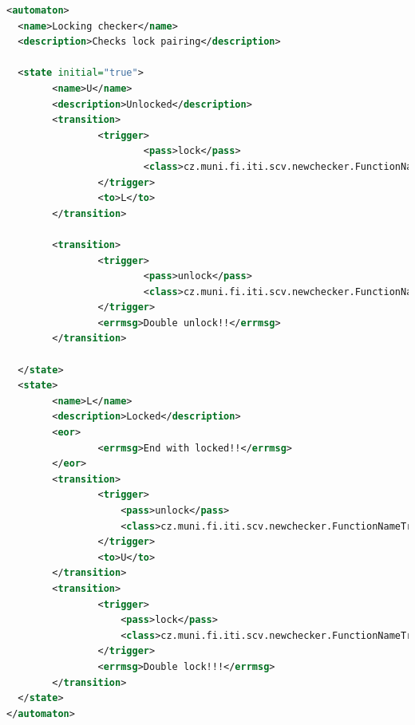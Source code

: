 \documentclass[11pt,final,oneside]{fithesis}
\begin{document}
\begin{lstlisting}[language=XML,caption=Zápis definičního souboru pro \textit{automaton checker},label=example-automatonchecker]
<automaton>
  <name>Locking checker</name>
  <description>Checks lock pairing</description>

  <state initial="true">
        <name>U</name>
        <description>Unlocked</description>
        <transition>
                <trigger>
                        <pass>lock</pass>
                        <class>cz.muni.fi.iti.scv.newchecker.FunctionNameTrigger</class>
                </trigger>
                <to>L</to>
        </transition>

        <transition>
                <trigger>
                        <pass>unlock</pass>
                        <class>cz.muni.fi.iti.scv.newchecker.FunctionNameTrigger</class>
                </trigger>
                <errmsg>Double unlock!!</errmsg>
        </transition>

  </state>
  <state>
        <name>L</name>
        <description>Locked</description>
        <eor>
                <errmsg>End with locked!!</errmsg>
        </eor>
        <transition>
                <trigger>
                    <pass>unlock</pass>
                    <class>cz.muni.fi.iti.scv.newchecker.FunctionNameTrigger</class>
                </trigger>
                <to>U</to>
        </transition>
        <transition>
                <trigger>
                    <pass>lock</pass>
                    <class>cz.muni.fi.iti.scv.newchecker.FunctionNameTrigger</class>
                </trigger>
                <errmsg>Double lock!!!</errmsg>
        </transition>
  </state>
</automaton>

\end{lstlisting}
\end{document}
